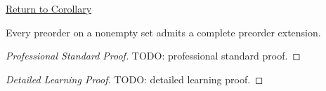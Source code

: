 \newpage
{}
\label{prf:complete-preorder-extension}

\begin{remark*}[Return]
\hyperref[cor:complete-preorder-extension]{Return to Corollary}
\end{remark*}

\begin{corollary*}
Every preorder on a nonempty set admits a complete preorder extension.
\end{corollary*}

\begin{proof}[Professional Standard Proof]
\LRAProofBodyStart
TODO: professional standard proof.
\end{proof}

\begin{proof}[Detailed Learning Proof]
\LRAProofBodyStart
TODO: detailed learning proof.
\end{proof}

\begin{remark*}
\end{remark*}

\begin{dependencies}
\NoLocalDependencies
\end{dependencies}

\clearpage
